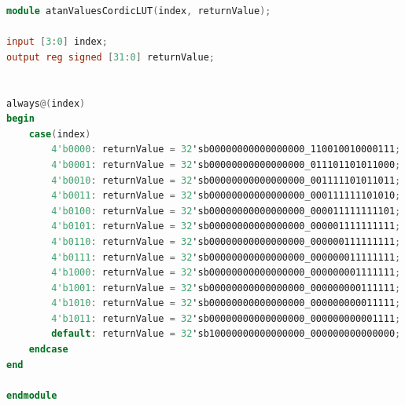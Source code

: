 \documentclass[a4paper, twoside, 11pt]{article}
\newcommand{\fbar}{\FloatBarrier}
\begin{document}
            \fbar
            \begin{lstlisting}[language={verilog}, caption={Verilog code of a atanValues \gls{abbreviation:lut} implementation. The \gls{abbreviation:lut} structure for scalingValues is very similar and therefore not depicted here.}, label= {lst:denominatorSizeScaleUnit-pseudocode}]
module atanValuesCordicLUT(index, returnValue);

input [3:0] index;
output reg signed [31:0] returnValue;


always@(index)
begin
    case(index)
        4'b0000: returnValue = 32'sb00000000000000000_110010010000111; // 0.7853981633974483
        4'b0001: returnValue = 32'sb00000000000000000_011101101011000; // 0.4636476090008061
        4'b0010: returnValue = 32'sb00000000000000000_001111101011011; // 0.24497866312686414
        4'b0011: returnValue = 32'sb00000000000000000_000111111101010; // 0.12435499454676144
        4'b0100: returnValue = 32'sb00000000000000000_000011111111101; // 0.06241880999595735
        4'b0101: returnValue = 32'sb00000000000000000_000001111111111; // 0.031239833430268277
        4'b0110: returnValue = 32'sb00000000000000000_000000111111111; // 0.015623728620476831
        4'b0111: returnValue = 32'sb00000000000000000_000000011111111; // 0.007812341060101111
        4'b1000: returnValue = 32'sb00000000000000000_000000001111111; // 0.007812341060101111
        4'b1001: returnValue = 32'sb00000000000000000_000000000111111; // 0.0019531225164788188
        4'b1010: returnValue = 32'sb00000000000000000_000000000011111; // 0.0009765621895593195
        4'b1011: returnValue = 32'sb00000000000000000_000000000001111; // 0.0004882812111948983
        default: returnValue = 32'sb10000000000000000_000000000000000; // 0
    endcase
end

endmodule\end{lstlisting}
        \fbar
\end{document}
